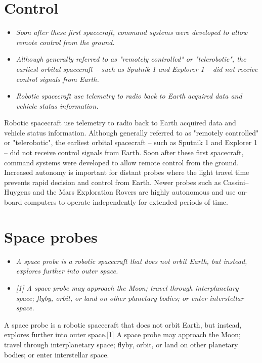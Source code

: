 \section{Control}\label{control}

\begin{itemize}
\item
  \emph{Soon after these first spacecraft, command systems were
  developed to allow remote control from the ground.}
\item
  \emph{Although generally referred to as "remotely controlled" or
  "telerobotic", the earliest orbital spacecraft -- such as Sputnik 1
  and Explorer 1 -- did not receive control signals from Earth.}
\item
  \emph{Robotic spacecraft use telemetry to radio back to Earth acquired
  data and vehicle status information.}
\end{itemize}

Robotic spacecraft use telemetry to radio back to Earth acquired data
and vehicle status information. Although generally referred to as
"remotely controlled" or "telerobotic", the earliest orbital spacecraft
-- such as Sputnik 1 and Explorer 1 -- did not receive control signals
from Earth. Soon after these first spacecraft, command systems were
developed to allow remote control from the ground. Increased autonomy is
important for distant probes where the light travel time prevents rapid
decision and control from Earth. Newer probes such as Cassini--Huygens
and the Mars Exploration Rovers are highly autonomous and use on-board
computers to operate independently for extended periods of time.

\section{Space probes}\label{space-probes}

\begin{itemize}
\item
  \emph{A space probe is a robotic spacecraft that does not orbit Earth,
  but instead, explores further into outer space.}
\item
  \emph{{[}1{]} A space probe may approach the Moon; travel through
  interplanetary space; flyby, orbit, or land on other planetary bodies;
  or enter interstellar space.}
\end{itemize}

A space probe is a robotic spacecraft that does not orbit Earth, but
instead, explores further into outer space.{[}1{]} A space probe may
approach the Moon; travel through interplanetary space; flyby, orbit, or
land on other planetary bodies; or enter interstellar space.

